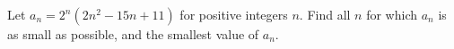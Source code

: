Let $a_n=2^n\left(2n^2-15n+11\right)$ for positive integers $n$. Find all $n$ for which $a_n$ is as small as possible, and the smallest value of $a_n$.
